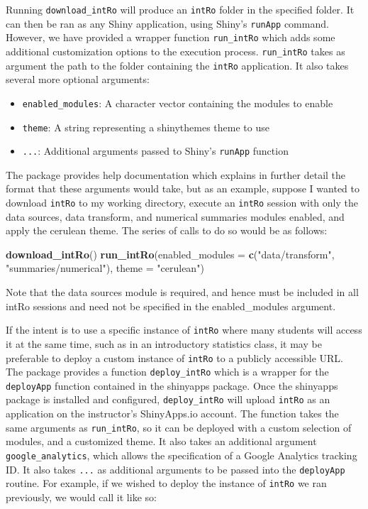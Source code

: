 \documentclass[12pt,]{article}
\providecommand{\tightlist}{%
  \setlength{\itemsep}{0pt}\setlength{\parskip}{0pt}}
\newenvironment{Shaded}{\begin{snugshade}}{\end{snugshade}}
\newcommand{\KeywordTok}[1]{\textcolor[rgb]{0.13,0.29,0.53}{\textbf{{#1}}}}
\newcommand{\DataTypeTok}[1]{\textcolor[rgb]{0.13,0.29,0.53}{{#1}}}
\newcommand{\StringTok}[1]{\textcolor[rgb]{0.31,0.60,0.02}{{#1}}}
\newcommand{\NormalTok}[1]{{#1}}
\begin{document}
Running \texttt{download\_intRo} will produce an \texttt{intRo} folder
in the specified folder. It can then be ran as any Shiny application,
using Shiny's \texttt{runApp} command. However, we have provided a
wrapper function \texttt{run\_intRo} which adds some additional
customization options to the execution process. \texttt{run\_intRo}
takes as argument the path to the folder containing the \texttt{intRo}
application. It also takes several more optional arguments:

\begin{itemize}
\tightlist
\item
  \texttt{enabled\_modules}: A character vector containing the modules
  to enable
\item
  \texttt{theme}: A string representing a shinythemes theme to use
\item
  \texttt{...}: Additional arguments passed to Shiny's \texttt{runApp}
  function
\end{itemize}

The package provides help documentation which explains in further detail
the format that these arguments would take, but as an example, suppose I
wanted to download \texttt{intRo} to my working directory, execute an
\texttt{intRo} session with only the data sources, data transform, and
numerical summaries modules enabled, and apply the cerulean theme. The
series of calls to do so would be as follows:

\begin{Shaded}
\begin{Highlighting}[]
\KeywordTok{download_intRo}\NormalTok{()}
\KeywordTok{run_intRo}\NormalTok{(}\DataTypeTok{enabled_modules =} \KeywordTok{c}\NormalTok{(}\StringTok{"data/transform"}\NormalTok{, }\StringTok{"summaries/numerical"}\NormalTok{), }
          \DataTypeTok{theme =} \StringTok{"cerulean"}\NormalTok{)}
\end{Highlighting}
\end{Shaded}

Note that the data sources module is required, and hence must be
included in all intRo sessions and need not be specified in the
enabled\_modules argument.

If the intent is to use a specific instance of \texttt{intRo} where many
students will access it at the same time, such as in an introductory
statistics class, it may be preferable to deploy a custom instance of
\texttt{intRo} to a publicly accessible URL. The package provides a
function \texttt{deploy\_intRo} which is a wrapper for the
\texttt{deployApp} function contained in the shinyapps package. Once the
shinyapps package is installed and configured, \texttt{deploy\_intRo}
will upload \texttt{intRo} as an application on the instructor's
ShinyApps.io account. The function takes the same arguments as
\texttt{run\_intRo}, so it can be deployed with a custom selection of
modules, and a customized theme. It also takes an additional argument
\texttt{google\_analytics}, which allows the specification of a Google
Analytics tracking ID. It also takes \texttt{...} as additional
arguments to be passed into the \texttt{deployApp} routine. For example,
if we wished to deploy the instance of \texttt{intRo} we ran previously,
we would call it like so:
\end{document}
